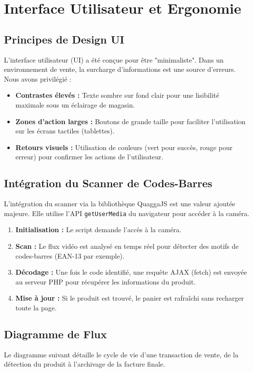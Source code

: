 \documentclass[12pt,a4paper]{report}
\begin{document}
\chapter{Interface Utilisateur et Ergonomie}
\section{Principes de Design UI}
L'interface utilisateur (UI) a été conçue pour être "minimaliste". Dans un environnement de vente, la surcharge d'informations est une source d'erreurs. Nous avons privilégié :
\begin{itemize}
    \item \textbf{Contrastes élevés :} Texte sombre sur fond clair pour une lisibilité maximale sous un éclairage de magasin.
    \item \textbf{Zones d'action larges :} Boutons de grande taille pour faciliter l'utilisation sur les écrans tactiles (tablettes).
    \item \textbf{Retours visuels :} Utilisation de couleurs (vert pour succès, rouge pour erreur) pour confirmer les actions de l'utilisateur.
\end{itemize}

\section{Intégration du Scanner de Codes-Barres}
L'intégration du scanner via la bibliothèque QuaggaJS est une valeur ajoutée majeure. Elle utilise l'API \texttt{getUserMedia} du navigateur pour accéder à la caméra.
\begin{enumerate}
    \item \textbf{Initialisation :} Le script demande l'accès à la caméra.
    \item \textbf{Scan :} Le flux vidéo est analysé en temps réel pour détecter des motifs de codes-barres (EAN-13 par exemple).
    \item \textbf{Décodage :} Une fois le code identifié, une requête AJAX (fetch) est envoyée au serveur PHP pour récupérer les informations du produit.
    \item \textbf{Mise à jour :} Si le produit est trouvé, le panier est rafraîchi sans recharger toute la page.
\end{enumerate}

\section{Diagramme de Flux}
Le diagramme suivant détaille le cycle de vie d'une transaction de vente, de la détection du produit à l'archivage de la facture finale.
\end{document}
